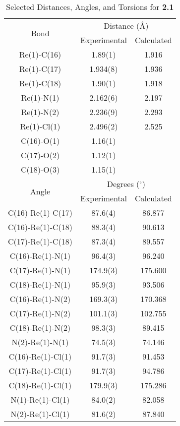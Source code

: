 \begin{table}[htbp]
  \caption{Selected Distances, Angles, and Torsions for \textbf{2.1}}
  \centering
    \begin{tabular}{ccc}
    \toprule
    \multirow{2}{*}{Bond} & \multicolumn{2}{c}{Distance (\r{A})} \\ \cline{2-3}
     & Experimental & Calculated \\ \midrule
    Re(1)-C(16) & 1.89(1) & 1.916 \\
    Re(1)-C(17) & 1.934(8) & 1.936 \\
    Re(1)-C(18) & 1.90(1) & 1.918 \\
    Re(1)-N(1) & 2.162(6) & 2.197 \\
    Re(1)-N(2) & 2.236(9) & 2.293 \\
    Re(1)-Cl(1) & 2.496(2) & 2.525 \\ 
    C(16)-O(1) & 1.16(1) & \\
    C(17)-O(2) & 1.12(1) & \\
    C(18)-O(3) & 1.15(1) & \\ \midrule
    \multirow{2}{*}{Angle} & \multicolumn{2}{c}{Degrees ($^\circ$)} \\ \cline{2-3}
     & Experimental & Calculated \\ \midrule
    C(16)-Re(1)-C(17) & 87.6(4) & 86.877 \\
    C(16)-Re(1)-C(18) & 88.3(4) & 90.613 \\
    C(17)-Re(1)-C(18) & 87.3(4) & 89.557 \\
    C(16)-Re(1)-N(1) & 96.4(3) & 96.240 \\
    C(17)-Re(1)-N(1) & 174.9(3) & 175.600 \\
    C(18)-Re(1)-N(1) & 95.9(3) & 93.506 \\
    C(16)-Re(1)-N(2) & 169.3(3) & 170.368 \\
    C(17)-Re(1)-N(2) & 101.1(3) & 102.755 \\
    C(18)-Re(1)-N(2) & 98.3(3) & 89.415 \\
    N(2)-Re(1)-N(1) & 74.5(3) & 74.146 \\
    C(16)-Re(1)-Cl(1) & 91.7(3) & 91.453 \\
    C(17)-Re(1)-Cl(1) & 91.7(3) & 94.786 \\
    C(18)-Re(1)-Cl(1) & 179.9(3) & 175.286 \\
    N(1)-Re(1)-Cl(1) & 84.0(2) & 82.058 \\
    N(2)-Re(1)-Cl(1) & 81.6(2) & 87.840 \\

\end{tabular}
\end{table}
